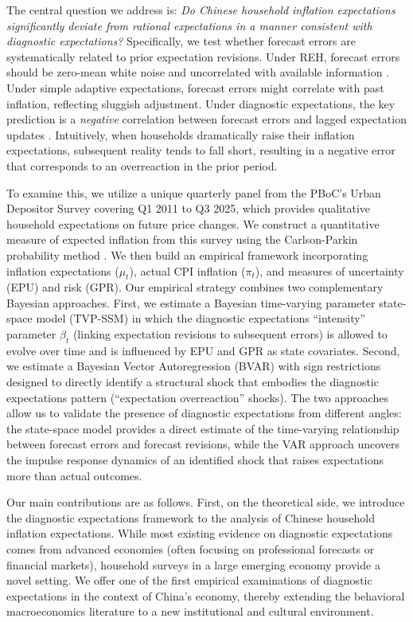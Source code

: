 \documentclass[12pt]{article}
\begin{document}
The central question we address is: \textit{Do Chinese household inflation expectations significantly deviate from rational expectations in a manner consistent with diagnostic expectations?} Specifically, we test whether forecast errors are systematically related to prior expectation revisions. Under REH, forecast errors should be zero-mean white noise and uncorrelated with available information \cite{Muth1961}. Under simple adaptive expectations, forecast errors might correlate with past inflation, reflecting sluggish adjustment. Under diagnostic expectations, the key prediction is a \textit{negative} correlation between forecast errors and lagged expectation updates \cite{Bordalo2018}. Intuitively, when households dramatically raise their inflation expectations, subsequent reality tends to fall short, resulting in a negative error that corresponds to an overreaction in the prior period.

To examine this, we utilize a unique quarterly panel from the PBoC's Urban Depositor Survey covering Q1 2011 to Q3 2025, which provides qualitative household expectations on future price changes. We construct a quantitative measure of expected inflation from this survey using the Carlson-Parkin probability method \cite{Carlson1975}. We then build an empirical framework incorporating inflation expectations ($\mu_t$), actual CPI inflation ($\pi_t$), and measures of uncertainty (EPU) and risk (GPR). Our empirical strategy combines two complementary Bayesian approaches. First, we estimate a Bayesian time-varying parameter state-space model (TVP-SSM) in which the diagnostic expectations “intensity” parameter $\beta_t$ (linking expectation revisions to subsequent errors) is allowed to evolve over time and is influenced by EPU and GPR as state covariates. Second, we estimate a Bayesian Vector Autoregression (BVAR) with sign restrictions designed to directly identify a structural shock that embodies the diagnostic expectations pattern (“expectation overreaction” shocks). The two approaches allow us to validate the presence of diagnostic expectations from different angles: the state-space model provides a direct estimate of the time-varying relationship between forecast errors and forecast revisions, while the VAR approach uncovers the impulse response dynamics of an identified shock that raises expectations more than actual outcomes.

Our main contributions are as follows. First, on the theoretical side, we introduce the diagnostic expectations framework to the analysis of Chinese household inflation expectations. While most existing evidence on diagnostic expectations comes from advanced economies (often focusing on professional forecasts or financial markets), household surveys in a large emerging economy provide a novel setting. We offer one of the first empirical examinations of diagnostic expectations in the context of China's economy, thereby extending the behavioral macroeconomics literature to a new institutional and cultural environment.
\end{document}

